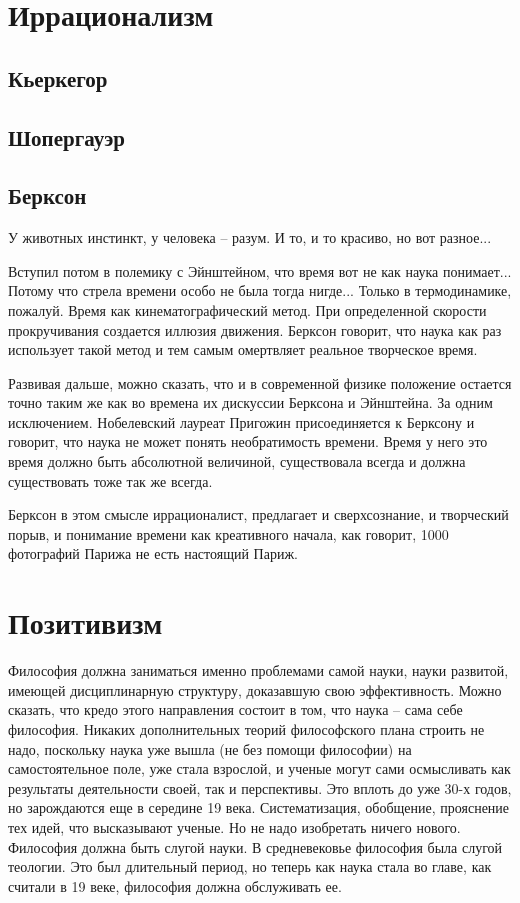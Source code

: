 \documentclass[a4paper, 12pt]{article}
\begin{document}

\section{Иррационализм}

\subsection{Кьеркегор}
\subsection{Шопергауэр}

\subsection{Берксон}

У животных инстинкт, у человека -- разум. И то, и то красиво, но вот 
разное...

Вступил потом в полемику с Эйнштейном, что время вот не как наука 
понимает... Потому что стрела времени особо не была тогда нигде... 
Только в термодинамике, пожалуй. Время как кинематографический метод. 
При определенной скорости прокручивания создается иллюзия движения. 
Берксон говорит, что наука как раз использует такой метод и тем самым 
омертвляет реальное творческое время.

Развивая дальше, можно сказать, что и в современной физике положение 
остается точно таким же как во времена их дискуссии Берксона 
и Эйнштейна. За одним исключением. Нобелевский лауреат Пригожин 
присоединяется к Берксону и говорит, что наука не может понять 
необратимость времени. Время у него это время должно быть абсолютной 
величиной, существовала всегда и должна существовать тоже так же всегда.

Берксон в этом смысле иррационалист, предлагает и сверхсознание, 
и творческий порыв, и понимание времени как креативного начала, как 
говорит, 1000 фотографий Парижа не есть настоящий Париж.

\section{Позитивизм}
Философия должна заниматься именно проблемами самой науки, науки 
развитой, имеющей дисциплинарную структуру, доказавшую свою 
эффективность. Можно сказать, что кредо этого направления состоит в том, 
что наука -- сама себе философия. Никаких дополнительных теорий 
философского плана строить не надо, поскольку наука уже вышла (не без 
помощи философии) на самостоятельное поле, уже стала взрослой, и ученые 
могут сами осмысливать как результаты деятельности своей, так 
и перспективы. Это вплоть до уже 30-х годов, но зарождаются еще 
в середине 19 века. Систематизация, обобщение, прояснение тех идей, что 
высказывают ученые. Но не надо изобретать ничего нового. Философия 
должна быть слугой науки. В средневековье философия была слугой 
теологии. Это был длительный период, но теперь как наука стала во главе, 
как считали в 19 веке, философия должна обслуживать ее.
\end{document}
